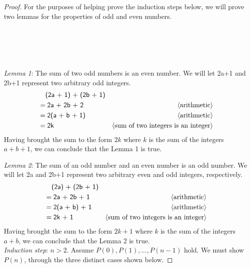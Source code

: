\documentclass[11pt,fleqn]{article}
\newcommand{\mname}[1]{\mbox{\sf #1}}
\newcommand{\pnote}[1]{{\langle \text{#1} \rangle}}
\begin{document}
\begin{enumerate}
\begin{proof}
    For the purposes of helping prove the induction steps below, we will prove two lemmas for the properties of odd and even numbers.\\\\\\\\\\\\
    
    \emph{Lemma 1}: The sum of two odd numbers is an even number. We will let 2a+1 and 2b+1 represent two arbitrary odd integers.
    \begin{align*}
      &\phantom{{}=} \mname {(2a + 1) + (2b + 1)} \\
      &= \mname{2a + 2b + 2}  & \pnote{arithmetic}\\
      &= \mname{2(a + b + 1)}  & \pnote{arithmetic}\\
      &= \mname{2k}  & \pnote{sum of two integers is an integer}
    \end{align*}
    Having brought the sum to the form $2k$ where $k$ is the sum of the integers $a+b+1$, we can conclude that the Lemma 1 is true.
    \medskip
    
    \emph{Lemma 2}: The sum of an odd number and an even number is an odd number. We will let 2a and 2b+1 represent two arbitrary even and odd integers, respectively.
    \begin{align*}
      &\phantom{{}=} \mname {(2a) + (2b + 1)} \\
      &= \mname{2a + 2b + 1}  & \pnote{arithmetic}\\
      &= \mname{2(a + b) + 1}  & \pnote{arithmetic}\\
      &= \mname{2k + 1}  & \pnote{sum of two integers is an integer}
    \end{align*}
    Having brought the sum to the form $2k+1$ where $k$ is the sum of the integers $a+b$, we can conclude that the Lemma 2 is true.\\
    
    \emph{Induction step}: $n > 2$.  Assume $P(0), P(1), \ldots, P(n-1)$
    hold.  We must show $P(n)$, through the three distinct cases shown below.
    

\end{proof}
\end{enumerate}
\end{document}
